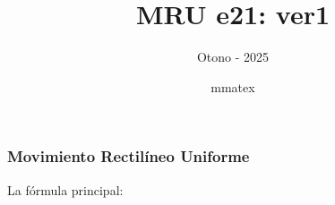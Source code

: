 \documentclass{beamer}
\title{MRU e21: ver1}
\subtitle{Otono - 2025}
\author{mmatex}
\begin{document}
\maketitle

\begin{frame}
\frametitle{Movimiento Rectil\'ineo Uniforme}
% 
 La f\'ormula principal:

                                                               
 
{\huge \vmru}
\vNUa
                                                               
                                                               
                                                               
                                                               
\end{frame}
\end{document}

